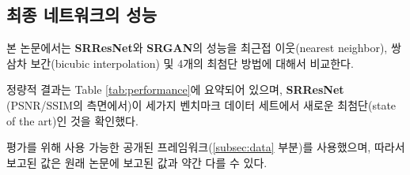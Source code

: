 \documentclass[10pt,twocolumn,letterpaper]{article}
\newcommand{\kor}[1]{#1}
\newcommand{\eng}[1]{}
\newcommand{\summary}[1]{}
\begin{document}
\subsection{\eng{Performance of the final networks}\kor{최종 네트워크의 성능}}
\label{subsec:msebased}
\eng{
We compare the performance of \textbf{SRResNet} and \textbf{SRGAN} to NN, bicubic interpolation, and four state-of-the-art methods.
}\kor{
본 논문에서는 \textbf{SRResNet}와 \textbf{SRGAN}의 성능을 최근접 이웃(nearest neighbor), 쌍삼차 보간(bicubic interpolation) 및 4개의 최첨단 방법에 대해서 비교한다.
}
\eng{
Quantitative results are summarized in Table \ref{tab:performance} and confirm that \textbf{SRResNet} (in terms of PSNR/SSIM) sets a new state of the art on three benchmark datasets.
}\kor{
정량적 결과는 Table \ref{tab:performance}에 요약되어 있으며, \textbf{SRResNet} (PSNR/SSIM의 측면에서)이 세가지 벤치마크 데이터 세트에서 새로운 최첨단(state of the art)인 것을 확인했다.
}
\eng{
Please note that we used a publicly available framework for evaluation (\cf Section \ref{subsec:data}), reported values might thus slightly deviate from those reported in the original papers.
}\kor{
평가를 위해 사용 가능한 공개된 프레임워크(\cf \ref{subsec:data} 부분)를 사용했으며, 따라서 보고된 값은 원래 논문에 보고된 값과 약간 다를 수 있다.
}

\summary{
각 방법에 대한 SRResNet와 SRGAN의 성능 비교
}
\end{document}
